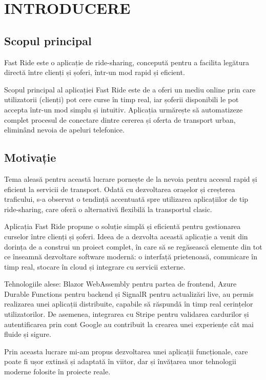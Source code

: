 \chapter{INTRODUCERE}
\section{Scopul principal}
Fast Ride este o aplicație de ride-sharing, concepută pentru a facilita legătura directă între clienți și șoferi, într-un mod rapid și eficient.

Scopul principal al aplicației Fast Ride este de a oferi un mediu online prin care utilizatorii (clienți) pot cere curse în timp real, iar șoferii disponibili le pot accepta într-un mod simplu și intuitiv. Aplicația urmărește să automatizeze complet procesul de conectare dintre cererea și oferta de transport urban, eliminând nevoia de apeluri telefonice.

\section{Motivație}
Tema aleasă pentru această lucrare pornește de la nevoia pentru accesul rapid și eficient la servicii de transport. Odată cu dezvoltarea orașelor și creșterea traficului, s-a observat o tendință accentuată spre utilizarea aplicațiilor de tip ride-sharing, care oferă o alternativă flexibilă la transportul clasic.

Aplicația Fast Ride propune o soluție simplă și eficientă pentru gestionarea curselor între clienți și șoferi. Ideea de a dezvolta această aplicație a venit din dorința de a construi un proiect complet, în care să se regăsească elemente din tot ce înseamnă dezvoltare software modernă: o interfață prietenoasă, comunicare în timp real, stocare în cloud și integrare cu servicii externe.

Tehnologiile alese: Blazor WebAssembly pentru partea de frontend, Azure Durable Functions pentru backend și SignalR pentru actualizări live, au permis realizarea unei aplicații distribuite, capabile să răspundă în timp real cerințelor utilizatorilor. De asemenea, integrarea cu Stripe pentru validarea cardurilor și autentificarea prin cont Google au contribuit la crearea unei experiențe cât mai fluide și sigure.

Prin aceasta lucrare mi-am propus dezvoltarea unei aplicații funcționale, care poate fi ușor extinsă și adaptată în viitor, dar și învățarea unor tehnologii moderne folosite în proiecte reale.